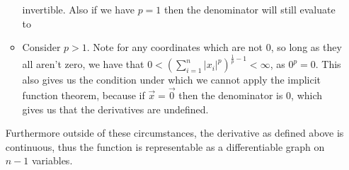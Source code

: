 \documentclass[12pt, letterpaper]{article}
\begin{document}
\begin{enumerate}
\begin{itemize}
		invertible.  Also if we have $p=1$ then the denominator 
		will still evaluate to 
		\item Consider $p > 1$.  Note for any coordinates which 
		are not $0$, so long as they all aren't zero, we have that 
		$0 < (\sum_{i=1}^n |x_i|^p )^{\frac{1}{p}-1} < \infty$, 
		as $0^p = 0$.  This also gives us the condition under 
		which we cannot apply the implicit function theorem, because 
		if $\vec{x} = \vec{0}$ then the denominator is $0$, which 
		gives us that the derivatives are undefined.  
	\end{itemize}
	Furthermore outside of these circumstances, the derivative 
	as defined above is continuous, thus the function is 
	representable as a differentiable graph on $n-1$ variables.  
\end{enumerate}
\end{document}
